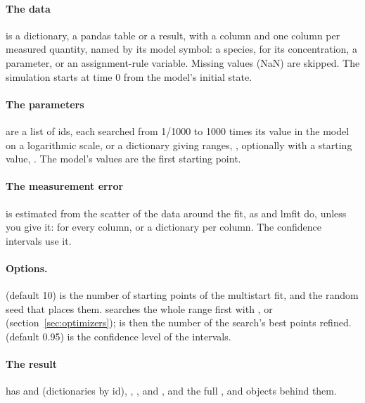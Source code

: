 \paragraph{The data} is a dictionary, a pandas table or a  result, with a  column
and one column per measured quantity, named by its model symbol: a species,  for its
concentration, a parameter, or an assignment-rule variable. Missing values (NaN) are skipped. The simulation
starts at time 0 from the model's initial state.

\paragraph{The parameters} are a list of ids, each searched from 1/1000 to 1000 times its value in the model on
a logarithmic scale, or a dictionary giving ranges, , optionally with a starting
value, . The model's values are the first starting point.

\paragraph{The measurement error} is estimated from the scatter of the data around the fit, as
 and lmfit do, unless you give it:  for every column, or a
dictionary per column. The confidence intervals use it.

\paragraph{Options.}  (default 10) is the number of starting points of the multistart fit, and
 the random seed that places them.  searches the whole range first with
,  or  (section~\ref{sec:optimizers});  is then the number of
the search's best points refined.  (default 0.95) is the confidence level of the intervals.

\paragraph{The result} has  and  (dictionaries by id), ,
,  and , and the full ,  and 
objects behind them.


